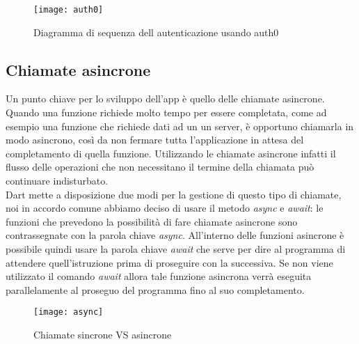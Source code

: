 \begin{figure}[h!]
    \centering
    \texttt{[image: auth0]}
    \caption{Diagramma di sequenza dell autenticazione usando auth0}
\end{figure}
\subsection{Chiamate asincrone}
Un punto chiave per lo sviluppo dell'app è quello delle chiamate asincrone.\\
Quando una funzione richiede molto tempo per essere completata, come ad esempio una funzione che richiede dati ad un un server, è opportuno chiamarla in modo asincrono, così da non fermare tutta l'applicazione in attesa del completamento di quella funzione. Utilizzando le chiamate asincrone infatti il flusso delle operazioni che non necessitano il termine della chiamata può continuare indisturbato.\\
Dart mette a disposizione due modi per la gestione di questo tipo di chiamate, noi in accordo comune abbiamo deciso di usare il metodo \textit{async} e \textit{await}: le funzioni che prevedono la possibilità di fare chiamate asincrone sono contrassegnate con la parola chiave \textit{async}. All'interno delle funzioni asincrone è possibile quindi usare la parola chiave \textit{await} che serve per dire al programma di attendere quell'istruzione prima di proseguire con la successiva. Se non viene utilizzato il comando \textit{await} allora tale funzione asincrona verrà eseguita parallelamente al proseguo del programma fino al suo completamento.\\
\begin{figure}[h!]
    \centering
    \texttt{[image: async]}
    \caption{Chiamate sincrone VS asincrone}
\end{figure}
